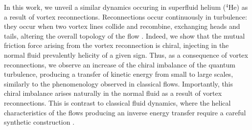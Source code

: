 \documentclass[%
 reprint,
 amsmath,amssymb,
 aps,
 prl,
]{revtex4-2}
\begin{document}
{In this work, we unveil a similar dynamics occuring in superfluid helium
($^4$He) as a result of vortex reconnections.  
Reconnections occur continuously in turbulence: they occur when
two vortex lines collide and recombine, exchanging heads and tails, 
altering the overall topology of the flow
\cite{koplik-levine-1993,bewley-etal-2008,rorai-etal-2016,serafini-etal-2017,galantucci-baggaley-parker-barenghi-2019,villois2020irreversible}. 
Indeed, we show that the mutual friction force arising from the  
vortex reconnection is chiral, injecting in the normal fluid prevalently 
helicity of a given sign. 
Thus, as a consequence of vortex reconnections,
we observe an increase of the chiral imbalance of 
the quantum turbulence, producing a transfer of
kinetic energy from small to large scales, similarly to the 
phenomenology observed in classical flows. 
Importantly, this chiral imbalance
arises naturally in the normal fluid 
as a result of vortex reconnections.
This is contrast to classical fluid dynamics, 
where the helical characteristics of the flows producing 
an inverse energy transfer require a careful synthetic construction 
\cite{biferaleInverseEnergyCascade2012a,biferale-etal-2013,sahoo-etal-2017,plunianInverseCascadeEnergy2020a}.

%



}
\end{document}
